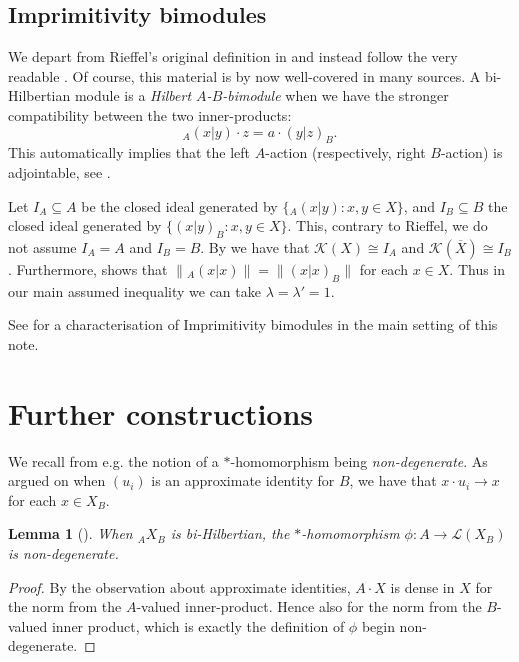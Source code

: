 \documentclass[a4paper,11pt]{article}
\theoremstyle{plain}
\newtheorem{lemma}[proposition]{Lemma}
\theoremstyle{remark}
\newcommand{\mc}[1]{\mathcal{#1}}
\begin{document}
\subsection{Imprimitivity bimodules}\label{sec:imprim}

We depart from Rieffel's original definition in \cite{Rieffel_induced_Cstar} and instead follow the very readable \cite{BMS_quasimults}.  Of course, this material is by now well-covered in many sources.  A bi-Hilbertian module is a \emph{Hilbert $A$-$B$-bimodule} when we have the stronger compatibility between the two inner-products:
\[ {}_A(x|y)\cdot z = a \cdot (y|z)_B. \]
This automatically implies that the left $A$-action (respectively, right $B$-action) is adjointable, see \cite[Remark~1.9]{BMS_quasimults}.

Let $I_A \subseteq A$ be the closed ideal generated by $\{ {}_A(x|y) : x,y\in X \}$, and $I_B \subseteq B$ the closed ideal generated by $\{ (x|y)_B : x,y\in X \}$.  This, contrary to Rieffel, we do not assume $I_A=A$ and $I_B=B$.  By \cite[Proposition~1.10]{BMS_quasimults} we have that $\mc K(X) \cong I_A$ and $\mc K(\overline X) \cong I_B$.  Furthermore, \cite[Corollary~1.11]{BMS_quasimults} shows that $\| {}_A(x|x) \| = \| (x|x)_B \|$ for each $x\in X$.  Thus in our main assumed inequality we can take $\lambda = \lambda' = 1$.

See \cite[Corollary~1.28]{KW_JonesIndexBimods} for a characterisation of Imprimitivity bimodules in the main setting of this note.



\section{Further constructions}

We recall from e.g. \cite[Proposition~2.5]{Lance_HilbModsBook} the notion of a $*$-homomorphism being \emph{non-degenerate}.  As argued on \cite[Page~5]{Lance_HilbModsBook} when $(u_i)$ is an approximate identity for $B$, we have that $x\cdot u_i \to x$ for each $x\in X_B$.

\begin{lemma}[{\cite[Proposition~2.16]{KPW_JonesIndexTheory}}]
When ${}_AX_B$ is bi-Hilbertian, the $*$-homomorphism $\phi\colon A\to\mc L(X_B)$ is non-degenerate.
\end{lemma}
\begin{proof}
By the observation about approximate identities, $A\cdot X$ is dense in $X$ for the norm from the $A$-valued inner-product.  Hence also for the norm from the $B$-valued inner product, which is exactly the definition of $\phi$ begin non-degenerate.
\end{proof}
\end{document}
